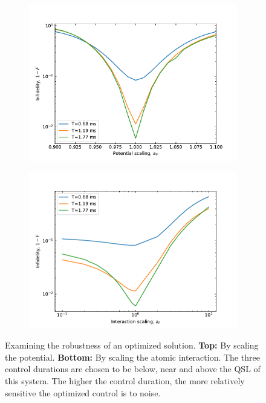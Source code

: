 \documentclass[a4paper, twocolumn]{revtex4-1}
\begin{document}
\begin{figure}
	\begin{subfigure}{\columnwidth}
		\centering
		\includegraphics[width=\columnwidth]{graphics/robustness/robustness.pdf}
	\end{subfigure}
	\begin{subfigure}{\columnwidth}
		\centering
		\includegraphics[width=\columnwidth]{graphics/robustness/interactionRobustness.pdf}
	\end{subfigure}
	\caption{Examining the robustness of an optimized solution. \textbf{Top:} By scaling the potential. \textbf{Bottom:} By scaling the atomic interaction. The three control durations are chosen to be below, near and above the QSL of this system. The higher the control duration, the more relatively sensitive the optimized control is to noise.}
	\label{fig:robustness}
\end{figure}
\end{document}
